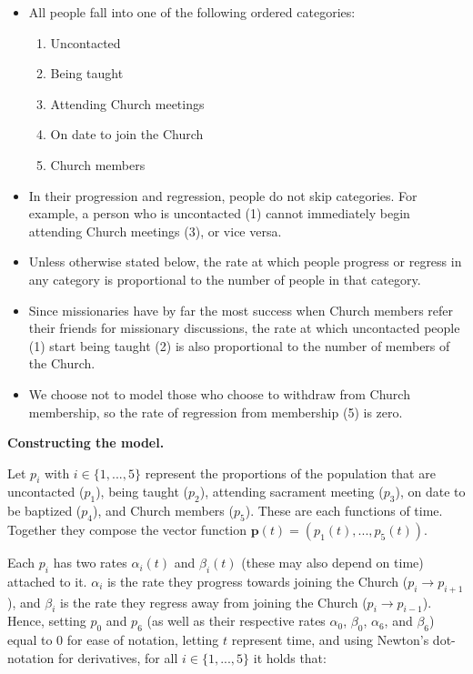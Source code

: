 \documentclass[11pt]{amsart}
\begin{document}
\begin{itemize}
    \item All people fall into one of the following ordered categories:
    \begin{enumerate}
        \item Uncontacted
        \item Being taught
        \item Attending Church meetings
        \item On date to join the Church
        \item Church members
    \end{enumerate}
    \item In their progression and regression, people do not skip categories. For example, a person who is uncontacted (1) cannot immediately begin attending Church meetings (3), or vice versa.
    \item Unless otherwise stated below, the rate at which people progress or regress in any category is proportional to the number of people in that category.
    \item Since missionaries have by far the most success when Church members refer their friends for missionary discussions, the rate at which uncontacted people (1) start being taught (2) is also proportional to the number of members of the Church.
    \item We choose not to model those who choose to withdraw from Church membership, so the rate of regression from membership (5) is zero.
\end{itemize}

\vspace{1em}
\begin{center}
    \textbf{Constructing the model.}
\end{center}
\nopagebreak

Let $p_i$ with $i \in \{1, ..., 5\}$ represent the proportions of the population that are uncontacted ($p_1$), being taught ($p_2$), attending sacrament meeting ($p_3$), on date to be baptized ($p_4$), and Church members ($p_5$). These are each functions of time. Together they compose the vector function $\boldsymbol{p}(t) = \left(p_1(t), ..., p_5(t)\right)$.

Each $p_i$ has two rates $\alpha_i(t)$ and $\beta_i(t)$ (these may also depend on time) attached to it. $\alpha_i$ is the rate they progress towards joining the Church ($p_i \rightarrow p_{i+1}$), and $\beta_i$ is the rate they regress away from joining the Church ($p_i \rightarrow p_{i-1}$). Hence, setting $p_0$ and $p_6$ (as well as their respective rates $\alpha_0$, $\beta_0$, $\alpha_6$, and $\beta_6$) equal to 0 for ease of notation, letting $t$ represent time, and using Newton's dot-notation for derivatives, for all $i \in \{1, ..., 5\}$ it holds that:
\end{document}
